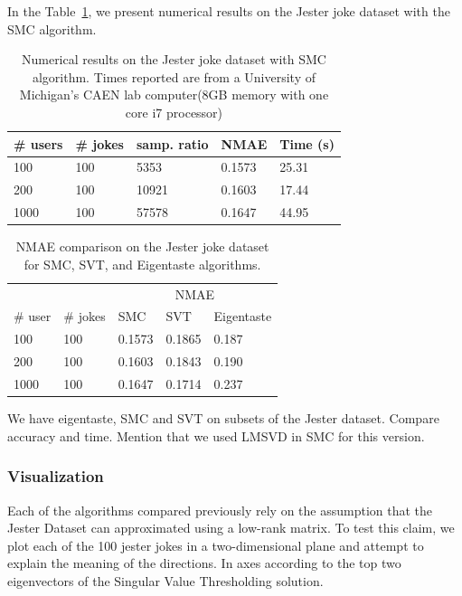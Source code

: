 \documentclass{article} %
\newcommand{\mc}[2]{\multicolumn{#1}{#2}}
\begin{document}
In the Table~\ref{SMC}, we present numerical results on the Jester
joke dataset with the SMC algorithm.

\begin{table} [h]
\centering
 \begin{tabular}{l l l l l}%
   \hline \hline
   \# users & \# jokes & samp. ratio & NMAE & Time (s)\\
   \hline
   100 & 100 & 5353 & 0.1573 & 25.31\\
   200 & 100 & 10921 & 0.1603 & 17.44\\
   1000 & 100 & 57578 & 0.1647 & 44.95\\
   \hline \hline
 \end{tabular}
 \caption{Numerical results on the Jester joke dataset with SMC
   algorithm. Times reported are from a University of Michigan's CAEN
   lab computer(8GB memory with one core i7 processor)}
\label{SMC}
\end{table}


\begin{table} [h]
\centering
 
 \begin{tabular}{l l | l l l }%
  \hline \hline
   & & \mc{3}{c}{NMAE}\\
  \# user & \# jokes & SMC  & SVT & Eigentaste\\
\hline
100 & 100 & 0.1573 & 0.1865 &0.187\\
200 & 100 & 0.1603 & 0.1843 & 0.190\\
1000 & 100 & 0.1647& 0.1714 & 0.237\\
\hline \hline
\end{tabular}
 \caption{NMAE comparison on the Jester joke dataset for SMC, SVT,
 and Eigentaste algorithms.}
\label{Compare}
 
\end{table}

We have eigentaste, SMC and SVT on subsets of the Jester dataset.
Compare accuracy and time. Mention that we used LMSVD in SMC for this
version.

\subsubsection{Visualization}

Each of the algorithms compared previously rely on the assumption that
the Jester Dataset can approximated using a low-rank matrix. To test
this claim, we plot each of the 100 jester jokes in a two-dimensional
plane and attempt to explain the meaning of the directions. In axes
according to the top two eigenvectors of the Singular Value
Thresholding solution.
\end{document}
